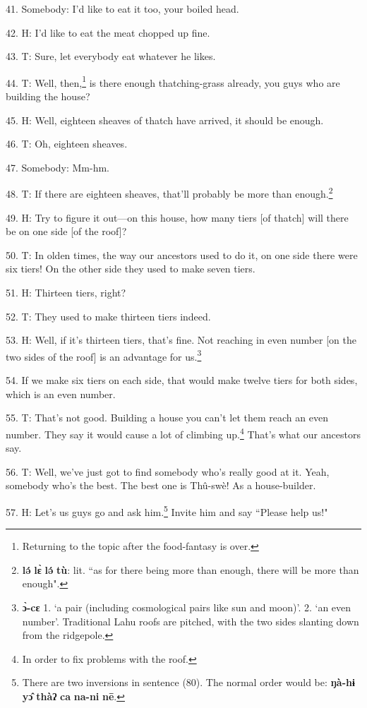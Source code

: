 41. Somebody: I'd like to eat it too, your boiled head.

42. H: I'd like to eat the meat chopped up fine.

43. T: Sure, let everybody eat whatever he likes.

44. T: Well, then,\footnote{Returning to the topic after the food-fantasy is over.} is there enough thatching-grass already, you guys who are
building the house?

45. H: Well, eighteen sheaves of thatch have arrived, it should be enough.

46. T: Oh, eighteen sheaves.

47. Somebody: Mm-hm.

48. T: If there are eighteen sheaves, that'll probably be more than enough.\footnote{\textbf{lə́} \textbf{lɛ̀} \textbf{lə́} \textbf{tù}: lit. ``as for there being more than enough, there will be more than enough".}

49. H: Try to figure it out---on this house, how many tiers [of thatch] will there
be on one side [of the roof]?

50. T: In olden times, the way our ancestors used to do it, on one side there were
six tiers! On the other side they used to make seven tiers.

51. H: Thirteen tiers, right?

52. T: They used to make thirteen tiers indeed.

53. H: Well, if it's thirteen tiers, that's fine. Not reaching in even number
[on the two sides of the roof] is an advantage for us.\footnote{\textbf{ɔ̀-cɛ} 1. `a pair (including cosmological pairs like sun and moon)'. 2. `an even number'. Traditional Lahu roofs are pitched, with the two sides slanting down from the ridgepole.}

54. If we make six tiers on each side, that would make twelve tiers for both sides,
which is an even number.

55. T: That's not good. Building a house you can't let them reach an even number.
They say it would cause a lot of climbing up.\footnote{In order to fix problems with the roof.} That's what our ancestors say.

56. T: Well, we've just got to find somebody who's really good at it. Yeah, somebody
who's the best. The best one is Thû-swè! As a house-builder.

57. H: Let's us guys go and ask him.\footnote{There are two inversions in sentence (80). The normal order would be: \textbf{ŋà-hɨ} \textbf{yɔ̂} \textbf{thàʔ} \textbf{ca} \textbf{na-ni} \textbf{nē}.} Invite him and say ``Please
help us!"

